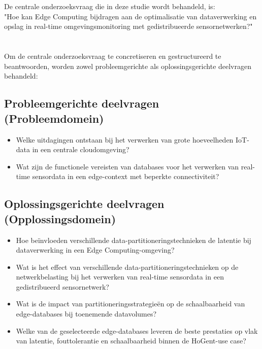 \section{}%
\label{sec:onderzoeksvraag}

De centrale onderzoeksvraag die in deze studie wordt behandeld, is: 
\\ "Hoe kan Edge Computing bijdragen aan de optimalisatie van dataverwerking en opslag in real-time omgevingsmonitoring met gedistribueerde sensornetwerken?" \\ 

\section{}%
\label{sec:deelvragen}

Om de centrale onderzoeksvraag te concretiseren en gestructureerd te beantwoorden, worden zowel probleemgerichte als oplossingsgerichte deelvragen behandeld:

\subsection*{Probleemgerichte deelvragen (Probleemdomein)}
\begin{itemize}
    \item Welke uitdagingen ontstaan bij het verwerken van grote hoeveelheden IoT-data in een centrale cloudomgeving?
    \item Wat zijn de functionele vereisten van databases voor het verwerken van real-time sensordata in een edge-context met beperkte connectiviteit?
\end{itemize}

\subsection*{Oplossingsgerichte deelvragen (Opplossingsdomein)}
\begin{itemize}
    \item Hoe beïnvloeden verschillende data-partitioneringstechnieken de latentie bij dataverwerking in een Edge Computing-omgeving?
    \item Wat is het effect van verschillende data-partitioneringstechnieken op de netwerkbelasting bij het verwerken van real-time sensordata in een gedistribueerd sensornetwerk?
    \item Wat is de impact van partitioneringsstrategieën op de schaalbaarheid van edge-databases bij toenemende datavolumes?
    \item Welke van de geselecteerde edge-databases leveren de beste prestaties op vlak van latentie, fouttolerantie en schaalbaarheid binnen de HoGent-use case?
\end{itemize}

